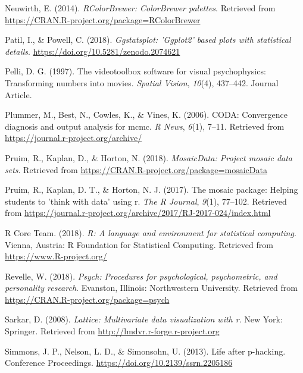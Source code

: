 \documentclass[man]{apa6}
\begin{document}
\leavevmode\hypertarget{ref-R-RColorBrewer}{}%
Neuwirth, E. (2014). \emph{RColorBrewer: ColorBrewer palettes}. Retrieved from \url{https://CRAN.R-project.org/package=RColorBrewer}

\leavevmode\hypertarget{ref-R-ggstatsplot}{}%
Patil, I., \& Powell, C. (2018). \emph{Ggstatsplot: 'Ggplot2' based plots with statistical details}. \url{https://doi.org/10.5281/zenodo.2074621}

\leavevmode\hypertarget{ref-Pelli_1997}{}%
Pelli, D. G. (1997). The videotoolbox software for visual psychophysics: Transforming numbers into movies. \emph{Spatial Vision}, \emph{10}(4), 437--442. Journal Article.

\leavevmode\hypertarget{ref-R-coda}{}%
Plummer, M., Best, N., Cowles, K., \& Vines, K. (2006). CODA: Convergence diagnosis and output analysis for mcmc. \emph{R News}, \emph{6}(1), 7--11. Retrieved from \url{https://journal.r-project.org/archive/}

\leavevmode\hypertarget{ref-R-mosaicData}{}%
Pruim, R., Kaplan, D., \& Horton, N. (2018). \emph{MosaicData: Project mosaic data sets}. Retrieved from \url{https://CRAN.R-project.org/package=mosaicData}

\leavevmode\hypertarget{ref-R-mosaic}{}%
Pruim, R., Kaplan, D. T., \& Horton, N. J. (2017). The mosaic package: Helping students to 'think with data' using r. \emph{The R Journal}, \emph{9}(1), 77--102. Retrieved from \url{https://journal.r-project.org/archive/2017/RJ-2017-024/index.html}

\leavevmode\hypertarget{ref-R-base}{}%
R Core Team. (2018). \emph{R: A language and environment for statistical computing}. Vienna, Austria: R Foundation for Statistical Computing. Retrieved from \url{https://www.R-project.org/}

\leavevmode\hypertarget{ref-R-psych}{}%
Revelle, W. (2018). \emph{Psych: Procedures for psychological, psychometric, and personality research}. Evanston, Illinois: Northwestern University. Retrieved from \url{https://CRAN.R-project.org/package=psych}

\leavevmode\hypertarget{ref-R-lattice}{}%
Sarkar, D. (2008). \emph{Lattice: Multivariate data visualization with r}. New York: Springer. Retrieved from \url{http://lmdvr.r-forge.r-project.org}

\leavevmode\hypertarget{ref-Simmons_2013_life}{}%
Simmons, J. P., Nelson, L. D., \& Simonsohn, U. (2013). Life after p-hacking. Conference Proceedings. \url{https://doi.org/10.2139/ssrn.2205186}
\end{document}
